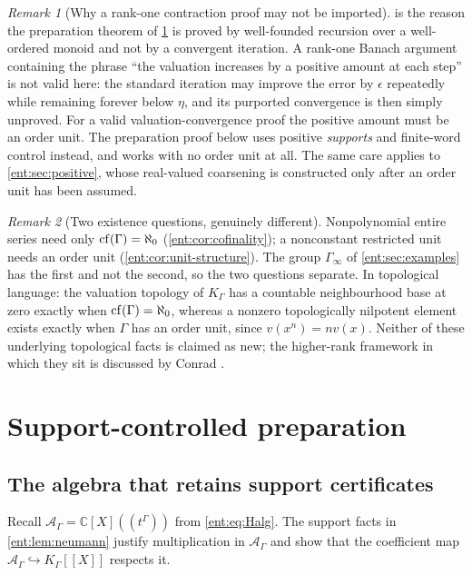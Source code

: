 \documentclass[11pt]{article}
\theoremstyle{plain}
\theoremstyle{plain}
\theoremstyle{plain}
\theoremstyle{definition}
\theoremstyle{definition}
\theoremstyle{definition}
\theoremstyle{definition}
\theoremstyle{remark}
\newtheorem{remark}[remark]{Remark}
\newcommand{\C}{\mathbb C}\newcommand{\R}{\mathbb R}
\newcommand{\K}{K_\Gamma}\newcommand{\KD}{K_\Delta}
\newcommand{\A}{\mathcal A_\Gamma}\newcommand{\OO}{\mathcal O_\Gamma}
\begin{document}
\begin{remark}[Why a rank-one contraction proof may not be imported]
\label{ent:rem:no-contraction}
 is the reason the preparation theorem of
\cref{ent:sec:prep} is proved by well-founded recursion over a well-ordered
monoid and not by a convergent iteration. A rank-one Banach argument
containing the phrase ``the valuation increases by a positive amount at each
step'' is not valid here: the standard iteration may improve the error by
$\epsilon$ repeatedly while remaining forever below $\eta$, and its purported
convergence is then simply unproved. For a valid valuation-convergence proof
the positive amount must be an order unit. The preparation proof below uses
positive \emph{supports} and finite-word control instead, and works with no
order unit at all. The same care applies to \cref{ent:sec:positive}, whose
real-valued coarsening is constructed only after an order unit has been
assumed.
\end{remark}

\begin{remark}[Two existence questions, genuinely different]
\label{ent:rem:two-existence}
Nonpolynomial entire series need only $\operatorname{cf}(\Gamma)=\aleph_0$
(\cref{ent:cor:cofinality}); a nonconstant restricted unit needs an order
unit (\cref{ent:cor:unit-structure}). The group $\Gamma_\infty$ of
\cref{ent:sec:examples} has the first and not the second, so the two
questions separate. In topological language: the valuation topology of $\K$
has a countable neighbourhood base at zero exactly when
$\operatorname{cf}(\Gamma)=\aleph_0$, whereas a nonzero topologically nilpotent element
exists exactly when $\Gamma$ has an order unit, since $v(x^n)=nv(x)$. Neither
of these underlying topological facts is claimed as new; the higher-rank
framework in which they sit is discussed by Conrad \cite{Conrad}.
\end{remark}

\section{Support-controlled preparation}
\label{ent:sec:prep}

\subsection{The algebra that retains support certificates}
Recall $\A=\C[X]((t^\Gamma))$ from \eqref{ent:eq:Halg}. The support facts in
\cref{ent:lem:neumann} justify multiplication in $\A$ and show that the
coefficient map $\A\hookrightarrow\K[[X]]$ respects it.
\end{document}
